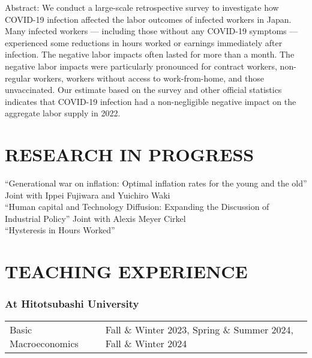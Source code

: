 \documentclass[12pt]{article}
\begin{document}
\begin{adjustwidth}{1em}{1em}
Abstract: We conduct a large-scale retrospective survey to investigate how COVID-19 infection affected the labor outcomes of infected workers in Japan. Many infected workers --- including those without any COVID-19 symptoms --- experienced some reductions in hours worked or earnings immediately after infection. The negative labor impacts often lasted for more than a month. The negative labor impacts were particularly pronounced for contract workers, non-regular workers, workers without access to work-from-home, and those unvaccinated. Our estimate based on the survey and other official statistics indicates that COVID-19 infection had a non-negligible negative impact on the aggregate labor supply in 2022.
\end{adjustwidth}

\section*{RESEARCH IN PROGRESS}
``Generational war on inflation: Optimal inflation rates for the young and the old'' Joint with Ippei Fujiwara and Yuichiro Waki\\
``Human capital and Technology Diffusion: Expanding the Discussion of Industrial Policy'' Joint with Alexis Meyer Cirkel\\
``Hysteresis in Hours Worked''\\


\section*{TEACHING EXPERIENCE}
\subsubsection*{At Hitotsubashi University}
\begin{tabular}{@{}ll}
Basic Macroeconomics&Fall \& Winter 2023, Spring \& Summer 2024, Fall \& Winter 2024
\end{tabular}
\end{document}
